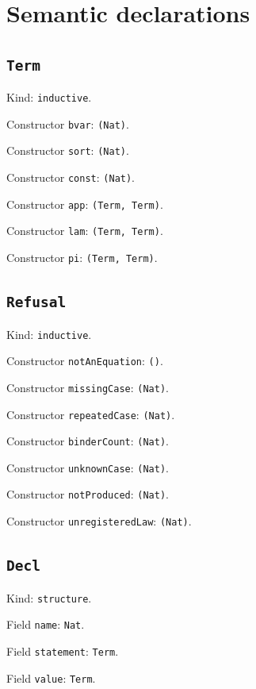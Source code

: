 \documentclass[11pt]{article}
\begin{document}
\section*{Semantic declarations}
\subsection*{\texttt{Term}}
\noindent Kind: \texttt{inductive}.\par
\noindent Constructor \texttt{bvar}: \texttt{(Nat)}.\par
\noindent Constructor \texttt{sort}: \texttt{(Nat)}.\par
\noindent Constructor \texttt{const}: \texttt{(Nat)}.\par
\noindent Constructor \texttt{app}: \texttt{(Term, Term)}.\par
\noindent Constructor \texttt{lam}: \texttt{(Term, Term)}.\par
\noindent Constructor \texttt{pi}: \texttt{(Term, Term)}.\par
\subsection*{\texttt{Refusal}}
\noindent Kind: \texttt{inductive}.\par
\noindent Constructor \texttt{notAnEquation}: \texttt{()}.\par
\noindent Constructor \texttt{missingCase}: \texttt{(Nat)}.\par
\noindent Constructor \texttt{repeatedCase}: \texttt{(Nat)}.\par
\noindent Constructor \texttt{binderCount}: \texttt{(Nat)}.\par
\noindent Constructor \texttt{unknownCase}: \texttt{(Nat)}.\par
\noindent Constructor \texttt{notProduced}: \texttt{(Nat)}.\par
\noindent Constructor \texttt{unregisteredLaw}: \texttt{(Nat)}.\par
\subsection*{\texttt{Decl}}
\noindent Kind: \texttt{structure}.\par
\noindent Field \texttt{name}: \texttt{Nat}.\par
\noindent Field \texttt{statement}: \texttt{Term}.\par
\noindent Field \texttt{value}: \texttt{Term}.\par
\end{document}
